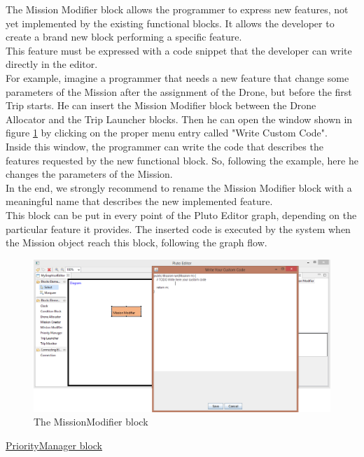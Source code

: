 The Mission Modifier block allows the programmer to express new features, not yet implemented  by the existing functional blocks.
It allows the developer to create a brand new block performing a specific feature.
\\
This feature must be expressed with a code snippet that the developer can write directly in the editor.
\\
For example, imagine a programmer that needs a new feature that change some parameters of the Mission after the assignment of the Drone, but before the first Trip starts. 
He can insert the Mission Modifier block between the Drone Allocator and the Trip Launcher blocks. 
Then he can open the window shown in figure \ref{fig:missionmodifier} by clicking on the proper menu entry called "Write Custom Code".
\\
Inside this window, the programmer can write the code that describes the features requested by the new functional block.
So, following the example, here he changes the parameters of the Mission.
\\
In the end, we strongly recommend to rename the Mission Modifier block with a meaningful name that describes the new implemented  feature.
\\
This block can be put in every point of the Pluto Editor graph, depending on the particular feature it provides.
The inserted code is executed by the system when the Mission object reach this block, following the graph flow.
\\

\begin{figure}[H]
\centering
\includegraphics[width=\linewidth]
{pictures/MissionModifier.png}
  \caption{The MissionModifier block}
  \label{fig:missionmodifier}
\end{figure}

\underline{PriorityManager block}
\\

